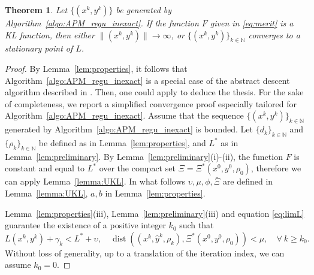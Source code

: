 \documentclass[pdflatex,sn-mathphys-num]{sn-jnl}
\numberwithin{equation}{section}%
\def\N{\mathbb{N}}
\theoremstyle{thmstyleone}%
\newtheorem{theorem}{Theorem}[section]%
\theoremstyle{thmstyletwo}%
\theoremstyle{thmstylethree}%
\begin{document}
\begin{theorem}\label{thm:iRAPM_convergence}
     Let  $\{(x^k,y^k)\}$ be generated by Algorithm~\ref{algo:APM_regu_inexact}. If the function $F$ given in \eqref{eq:merit} is a KL function,
    then either $\|(x^k,y^k)\|\rightarrow \infty$, or  $\{(x^k,y^k)\}_{k\in\mathbb{N}}$ converges to a stationary point of $L$.
\end{theorem}

\begin{proof}
By Lemma~\ref{lem:properties}, it follows that Algorithm~\ref{algo:APM_regu_inexact} is a special case of the abstract descent algorithm described in \cite[Condition 3]{Bonettini-Ochs-Prato-Rebegoldi-2023}. Then, one could apply \cite[Theorem 5]{Bonettini-Ochs-Prato-Rebegoldi-2023} to deduce the thesis. For the sake of completeness, we report a simplified convergence proof especially tailored for Algorithm~\ref{algo:APM_regu_inexact}.
Assume that the sequence $\{(x^k,y^k)\}_{k\in\N}$ generated by Algorithm~\ref{algo:APM_regu_inexact} is bounded. Let $\{d_k\}_{k\in\mathbb{N}}$ and $\{\rho_k\}_{k\in\N}$ be defined as in Lemma~\ref{lem:properties}, and $L^*$ as in Lemma~\ref{lem:preliminary}. By Lemma~\ref{lem:preliminary}(i)-(ii), the function $F$ is constant and equal to $L^*$ over the compact set $\Xi = \Xi^*(x^0,y^0,\rho_0)$, therefore we can apply Lemma~\ref{lemma:UKL}. {In what follows $\upsilon,\mu,\phi, \bar{\Xi}$ are defined in Lemma~\ref{lemma:UKL}, $a,b$ in Lemma~\ref{lem:properties}}.

Lemma~\ref{lem:properties}(iii), Lemma~\ref{lem:preliminary}(iii) and equation \eqref{eq:limL} guarantee the existence of a positive integer $k_0$ such that
\begin{equation}\label{upsilon}
    L(x^k,y^k)+\gamma_k < L^* + \upsilon, \quad \operatorname{dist}( (x^k,\hat{y}^k,\rho_k),\Xi^*(x^0,y^0,\rho_0) ) < \mu, \quad \forall \ k\geq k_0.
\end{equation}
Without loss of generality, up to a translation of the iteration index, we can assume $k_0=0$.


\end{proof}
\end{document}
